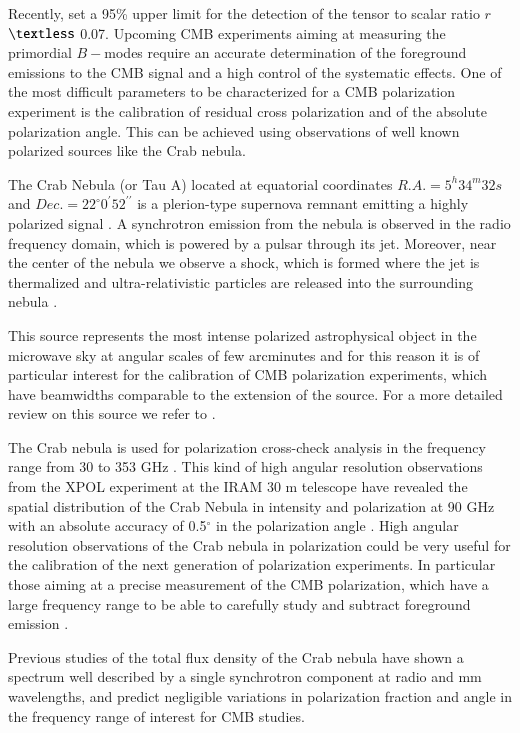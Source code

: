 \documentclass[twocolumn,traditabstract]{aa}
\begin{document}
Recently, \citet{bicepplanck2015,bicep2016} set a 95\% upper limit for the detection of the tensor to scalar ratio $r$ $\textless$ 0.07.
Upcoming CMB experiments aiming at measuring the primordial $B-$modes require an accurate determination of the foreground emissions to the CMB signal and a high control of the systematic effects. One of the most difficult parameters to be characterized for a CMB polarization experiment is the calibration of residual cross polarization and of the absolute polarization angle. This can be achieved using observations of well known polarized sources like the Crab nebula.

The Crab Nebula (or Tau A) located at equatorial coordinates $R.A. = 5^h34^m32s$ and $Dec. = 22^{\circ}0^{\prime}52^{\prime\prime}$ is a plerion-type supernova remnant emitting a highly polarized signal \citep{1978A&A....70..419W,1991ApJ...368..463M}.
A synchrotron emission from the nebula is observed in the radio frequency domain, which is powered by a pulsar through its jet. 
Moreover, near the center of the nebula we observe a shock, which is formed where the jet is thermalized and ultra-relativistic particles are released into the surrounding nebula \citep{2000ApJ...536L..81W,2011A&A...528A..11W}. 

This source represents the most intense polarized astrophysical object in the microwave sky at angular scales of few arcminutes and for this reason it is of particular interest  for the calibration of CMB polarization experiments, which have beamwidths comparable to the extension of the source.
For a more detailed review on this source we refer to \citet{2008ARA&A..46..127H}.

The Crab nebula is used for polarization cross-check analysis in the frequency range from 30 to 353 GHz \citep{2011ApJS..192...19W,2015arXiv150702058P}. This kind of high angular resolution observations from the XPOL experiment \citep{thum2008} at the IRAM 30 m telescope have revealed the spatial distribution of the Crab Nebula in intensity and polarization at 90 GHz with an absolute accuracy of 0.5$^{\circ}$ in the polarization angle \citep{aumont2010}. 
High angular resolution observations of the Crab nebula in polarization could be very useful for the calibration of the next generation of polarization experiments. In particular those aiming at a precise measurement of the CMB polarization, which have a large frequency range to be able to carefully study and subtract foreground emission \citep{2016IJMPD..2540008K}. 

Previous studies \citep{macias2010} of the total flux density of the Crab nebula have shown a spectrum well described by a single synchrotron component at radio and mm wavelengths, and predict negligible variations in polarization fraction and angle in the frequency range of interest for CMB studies.
 
\end{document}
